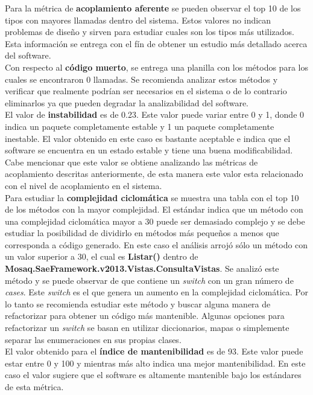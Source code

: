Para la métrica de \textbf{acoplamiento aferente} se pueden observar el top 10 
de los tipos con mayores llamadas dentro del sistema. Estos valores no indican 
problemas de diseño y sirven para estudiar cuales son los tipos más utilizados. 
Esta información se entrega con el fín de obtener un estudio más detallado 
acerca del software.
\\

Con respecto al \textbf{código muerto}, se entrega una planilla con los métodos 
para los cuales se encontraron 0 llamadas. Se recomienda analizar estos métodos 
y verificar que realmente podrían ser necesarios en el sistema o de lo contrario 
eliminarlos ya que pueden degradar la analizabilidad del software.
\\

El valor de \textbf{instabilidad} es de 0.23. Este valor puede variar entre 
0 y 1, donde 0 indica un paquete completamente estable y 1 un paquete 
completamente inestable. El valor obtenido en este caso es bastante aceptable 
e indica que el software se encuentra en un estado estable y tiene una buena 
modificabilidad. Cabe mencionar que este valor se obtiene analizando las 
métricas de acoplamiento descritas anteriormente, de esta manera este valor 
esta relacionado con el nivel de acoplamiento en el sistema.
\\

Para estudiar la \textbf{complejidad ciclomática} se muestra una tabla con 
el top 10 de los métodos con la mayor complejidad. El estándar indica
que un método con una complejidad ciclomática mayor a 30 puede 
ser demasiado complejo y se debe estudiar la posibilidad de dividirlo en 
métodos más pequeños a menos que corresponda a código generado.
En este caso el análisis arrojó sólo un método con un valor superior a 30, 
el cual es \textbf{Listar()} dentro de \textbf{Mosaq.SaeFramework.v2013.Vistas.ConsultaVistas}.
Se analizó este método y se puede observar de que contiene un \textit{switch} 
con un gran número de \textit{cases}. Este \textit{switch} es el que genera 
un aumento en la complejidad ciclomática. Por lo tanto se recomienda estudiar 
este método y buscar alguna manera de refactorizar para obtener un código 
más mantenible. Algunas opciones para refactorizar un \textit{switch} 
se basan en utilizar diccionarios, mapas o simplemente separar las enumeraciones 
en sus propias clases.
\\

El valor obtenido para el \textbf{índice de mantenibilidad} es de 93. Este 
valor puede estar entre 0 y 100 y mientras más alto indica una mejor 
mantenibilidad. En este caso el valor sugiere que el software es altamente 
mantenible bajo los estándares de esta métrica.
\\

